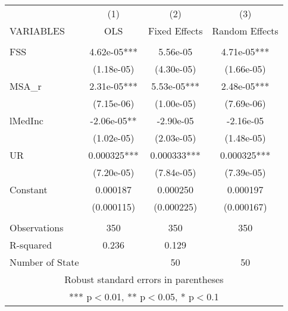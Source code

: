 \documentclass[]{article}
\begin{document}
\begin{tabular}{lccc} \hline
 & (1) & (2) & (3) \\
VARIABLES & OLS & Fixed Effects & Random Effects \\ \hline
 &  &  &  \\
FSS & 4.62e-05*** & 5.56e-05 & 4.71e-05*** \\
 & (1.18e-05) & (4.30e-05) & (1.66e-05) \\
MSA\_r & 2.31e-05*** & 5.53e-05*** & 2.48e-05*** \\
 & (7.15e-06) & (1.00e-05) & (7.69e-06) \\
lMedInc & -2.06e-05** & -2.90e-05 & -2.16e-05 \\
 & (1.02e-05) & (2.03e-05) & (1.48e-05) \\
UR & 0.000325*** & 0.000333*** & 0.000325*** \\
 & (7.20e-05) & (7.84e-05) & (7.39e-05) \\
Constant & 0.000187 & 0.000250 & 0.000197 \\
 & (0.000115) & (0.000225) & (0.000167) \\
 &  &  &  \\
Observations & 350 & 350 & 350 \\
R-squared & 0.236 & 0.129 &  \\
 Number of State &  & 50 & 50 \\ \hline
\multicolumn{4}{c}{ Robust standard errors in parentheses} \\
\multicolumn{4}{c}{ *** p$<$0.01, ** p$<$0.05, * p$<$0.1} \\
\end{tabular}
\end{document}
